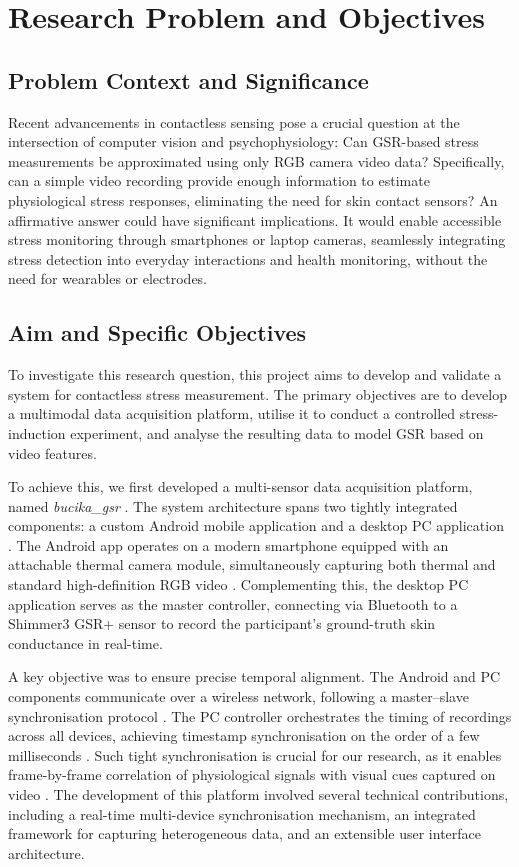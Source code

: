 \documentclass[11pt,a4paper]{report}
\begin{document}
\section{Research Problem and Objectives}

\subsection{Problem Context and Significance}

Recent advancements in contactless sensing pose a crucial question at the
intersection of computer vision and psychophysiology: Can GSR-based stress
measurements be approximated using only RGB camera video data? Specifically, can
a simple video recording provide enough information to estimate physiological
stress responses, eliminating the need for skin contact sensors? An affirmative
answer could have significant implications. It would enable accessible stress
monitoring through smartphones or laptop cameras, seamlessly integrating stress
detection into everyday interactions and health monitoring, without the need for
wearables or electrodes.

\subsection{Aim and Specific Objectives}

To investigate this research question, this project aims to develop and validate
a system for contactless stress measurement. The primary objectives are to
develop a multimodal data acquisition platform, utilise it to conduct a
controlled stress-induction experiment, and analyse the resulting data to model
GSR based on video features.

To achieve this, we first developed a multi-sensor data acquisition platform, named \textit{bucika\_gsr}
.
The system architecture spans two tightly integrated components: a custom Android mobile application and a desktop PC application
.
The Android app operates on a modern smartphone equipped with an attachable thermal camera module, simultaneously capturing both thermal and standard high-definition RGB video
.
Complementing this, the desktop PC application serves as the master controller, connecting via Bluetooth to a Shimmer3 GSR+ sensor to record the participant's ground-truth skin conductance in real-time.

A key objective was to ensure precise temporal alignment.
The Android and PC components communicate over a wireless network, following a master--slave synchronisation protocol
.
The PC controller orchestrates the timing of recordings across all devices, achieving timestamp synchronisation on the order of a few milliseconds
.
Such tight synchronisation is crucial for our research, as it enables frame-by-frame correlation of physiological signals with visual cues captured on video \cite{Gravina2017}
.
The development of this platform involved several technical contributions, including a real-time multi-device synchronisation mechanism, an integrated framework for capturing heterogeneous data, and an extensible user interface architecture.
\end{document}
